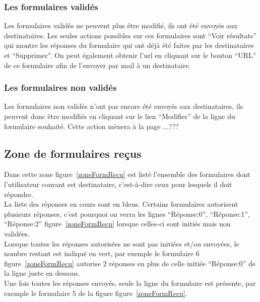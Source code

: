 \documentclass[a4paper,11pt,final]{report}
\begin{document}
\subsubsection{Les formulaires validés}
Les formulaires validés ne peuvent plus être modifié, ils ont été envoyés aux destinataires. Les seules actions possibles sur ces formulaires sont ``Voir résultats'' qui montre les réponses du formulaire qui ont déjà été faites par les destinataires et ``Supprimer''. On peut également obtenir l'url en cliquant sur le bouton ``URL'' de ce formulaire afin de l'envoyer par mail à un destinataire.

\noindent\begin{minipage}{\linewidth}%
\label{urlForm}
\end{minipage}

\subsubsection{Les formulaires non validés}
Les formulaires non validés n'ont pas encore été envoyés aux destinataires, ils peuvent donc être modifiés en cliquant sur le lien ``Modifier'' de la ligne du formulaire souhaité. Cette action mènera à la page ...???

\subsection{Zone de formulaires reçus}
Dans cette zone figure~\ref{zoneFormRecu} est listé l'ensemble des formulaires dont l'utilisateur courant est destinataire, c'est-à-dire ceux pour lesquels il doit répondre.\\
La liste des réponses en cours sont en bleus. Certains formulaires autorisent plusieurs réponses, c'est pourquoi on verra les lignes ``Réponse\string:0'', ``Réponse\string:1'', ``Réponse\string:2'' figure~\ref{zoneFormRecu} lorsque celles-ci sont initiés mais non validées.\\
Lorsque toutes les réponses autorisées ne sont pas initiées et/ou envoyées, le nombre restant est indiqué en vert, par exemple le formulaire 6 figure~\ref{zoneFormRecu} autorise 2 réponses en plus de celle initiée ``Réponse\string:0'' de la ligne juste en dessous.\\
Une fois toutes les réponses envoyés, seule la ligne du formulaire est présente, par exemple le formulaire 5 de la figure figure~\ref{zoneFormRecu}.\\
\end{document}
